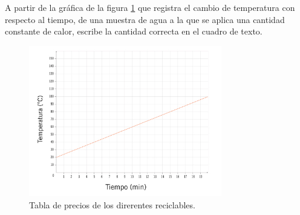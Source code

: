 \question[10] A partir de la gráfica de la figura \ref{fig:SINMAT1_U3_AC75_IMG3} que registra el cambio de temperatura con respecto al tiempo, de una muestra de agua a la que se aplica una cantidad constante de calor, escribe la cantidad correcta en el cuadro de texto.
\begin{figure}[H]
    \centering
    \includegraphics[width=0.75\textwidth]{../images/SINMAT1_U3_AC75_IMG3.jpg}
    \caption{Tabla de precios de los direrentes reciclables.}
    \label{fig:SINMAT1_U3_AC75_IMG3}
\end{figure}
\begin{parts}
    
    
    
    
    

\end{parts}
